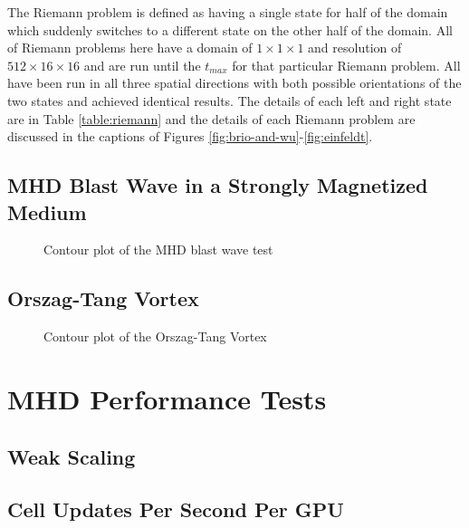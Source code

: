 The Riemann problem is defined as having a single state for half of the domain which suddenly switches to a different state on the other half of the domain. All of Riemann problems here have a domain of $1\times1\times1$ and resolution of $512\times16\times16$ and are run until the $t_{max}$ for that particular Riemann problem. All have been run in all three spatial directions with both possible orientations of the two states and achieved identical results. The details of each left and right state are in Table \ref{table:riemann} and the details of each Riemann problem are discussed in the captions of Figures \ref{fig:brio-and-wu}-\ref{fig:einfeldt}.





\subsection{MHD Blast Wave in a Strongly Magnetized Medium}
\label{sec:mhd-blast}

\begin{figure}[ht!]
    \caption{Contour plot of the MHD blast wave test }
    \label{fig:blast}
\end{figure}

\subsection{Orszag-Tang Vortex}
\label{sec:otv}

\begin{figure}[ht!]
    \caption{Contour plot of the Orszag-Tang Vortex }
    \label{fig:otv}
\end{figure}

\section{MHD Performance Tests}
\label{sec:mhd-perf-tests}


\subsection{Weak Scaling}

\subsection{Cell Updates Per Second Per GPU}

